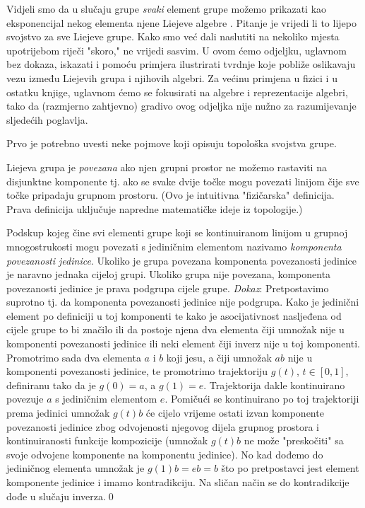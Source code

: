 Vidjeli smo da u slučaju grupe  
\emph{svaki} element grupe možemo prikazati kao eksponencijal nekog
elementa njene Liejeve algebre .
Pitanje je vrijedi li to lijepo svojstvo za sve Liejeve grupe.
Kako smo već dali naslutiti na nekoliko mjesta upotrijebom riječi "skoro,"
ne vrijedi sasvim. U ovom ćemo odjeljku, uglavnom
bez dokaza, iskazati i pomoću primjera ilustrirati tvrdnje koje 
pobliže oslikavaju vezu između Liejevih grupa i njihovih algebri.
Za većinu primjena u fizici i u ostatku knjige, uglavnom ćemo
se fokusirati na algebre i reprezentacije algebri, tako da (razmjerno
zahtjevno) gradivo ovog odjeljka nije nužno za razumijevanje sljedećih
poglavlja.

Prvo je potrebno uvesti neke pojmove koji opisuju topološka
svojstva grupe.
\begin{definicija}[Povezanost] 
Liejeva grupa je \emph{povezana} ako njen grupni prostor ne možemo
rastaviti na disjunktne komponente tj. ako se svake dvije točke 
mogu povezati linijom čije sve točke pripadaju grupnom prostoru.
(Ovo je intuitivna "fizičarska" definicija. Prava definicija uključuje napredne
matematičke ideje iz topologije.)
\label{def:povezanost}
\end{definicija}
Podskup kojeg čine svi elementi grupe koji se
kontinuiranom linijom u grupnoj mnogostrukosti mogu povezati s
jediničnim elementom nazivamo \emph{komponenta povezanosti jedinice}.
Ukoliko je grupa povezana komponenta povezanosti jedinice je naravno
jednaka cijeloj grupi. Ukoliko grupa nije povezana, komponenta povezanosti
jedinice je prava podgrupa cijele grupe. \emph{Dokaz}: Pretpostavimo
suprotno tj. da komponenta povezanosti jedinice nije podgrupa. Kako je
jedinični element po definiciji u toj komponenti te kako je asocijativnost
nasljeđena od cijele grupe to bi značilo ili da postoje njena dva elementa čiji
umnožak nije u komponenti povezanosti jedinice ili neki element čiji inverz nije u 
toj komponenti.
Promotrimo sada dva elementa $a$ i $b$ koji jesu, a čiji umnožak $ab$ nije u komponenti
povezanosti jedinice, te promotrimo trajektoriju $g(t)$, $t\in[0,1]$,
definiranu tako da je $g(0)=a$, a $g(1)=e$. Trajektorija dakle
kontinuirano povezuje $a$ s jediničnim elementom $e$.
Pomičući se kontinuirano po toj trajektoriji prema jedinici
umnožak $g(t)b$ će cijelo vrijeme ostati izvan komponente povezanosti jedinice
zbog odvojenosti njegovog dijela grupnog prostora i kontinuiranosti
funkcije kompozicije (umnožak $g(t)b$ ne može "preskočiti" sa svoje odvojene
komponente na komponentu jedinice). No kad dođemo do jediničnog elementa
umnožak je $g(1)b = eb = b$ što po pretpostavci jest element komponente jedinice
i imamo kontradikciju. Na sličan način se do kontradikcije dođe u slučaju inverza.\qed

